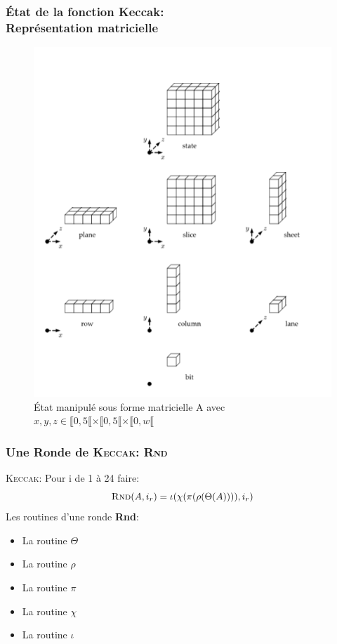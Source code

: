\begin{frame}
  \frametitle{État de la fonction Keccak:\\ Représentation matricielle}
  \vfill
\begin{figure}[H]
\centering
\includegraphics[scale=0.3]{StateArray.png}
\caption{État manipulé sous forme matricielle A avec $x,y,z \in\llbracket 0,5 \llbracket \times \llbracket 0,5 \llbracket \times \llbracket 0,w \llbracket$}
\end{figure}
  \vfill
\end{frame}

\begin{frame}
  \frametitle{Une Ronde de \textsc{Keccak}: \textsc{Rnd}}
  \vfill
  \textsc{Keccak}: Pour i de 1 à 24 faire: 
$$\textsc{Rnd}(A,i_r)=\iota ( \chi ( \pi ( \rho (\Theta (A)))), i_r)$$
\vspace{1cm}
Les routines d'une ronde \textbf{Rnd}:
  \begin{itemize}
  \item{La routine $\Theta$}
  \item{La routine $\rho$}
  \item{La routine $\pi$}
  \item{La routine $\chi$}
  \item{La routine $\iota$}
   \end{itemize}
  \vfill
\end{frame}

